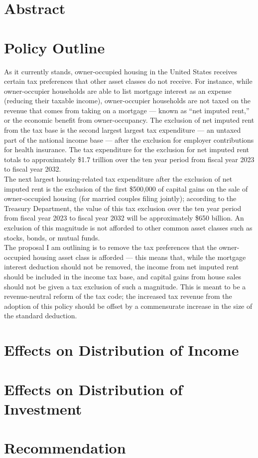 \documentclass[12pt]{extarticle}
\title{}
\author{}
\date{}
\begin{document}
\doublespacing
  \section*{Abstract}%
  \section*{Policy Outline}%
  As it currently stands, owner-occupied housing in the United States receives certain tax preferences that other asset classes do not receive. For instance, while owner-occupier households are able to list mortgage interest as an expense (reducing their taxable income), owner-occupier households are not taxed on the revenue that comes from taking on a mortgage --- known as ``net imputed rent,'' or the economic benefit from owner-occupancy. The exclusion of net imputed rent from the tax base is the second largest largest tax expenditure --- an untaxed part of the national income base --- after the exclusion for employer contributions for health insurance. The tax expenditure for the exclusion for net imputed rent totals to approximately \$1.7 trillion over the ten year period from fiscal year 2023 to fiscal year 2032.\\

  The next largest housing-related tax expenditure after the exclusion of net imputed rent is the exclusion of the first \$500,000 of capital gains on the sale of owner-occupied housing (for married couples filing jointly); according to the Treasury Department, the value of this tax exclusion over the ten year period from fiscal year 2023 to fiscal year 2032 will be approximately \$650 billion. An exclusion of this magnitude is not afforded to other common asset classes such as stocks, bonds, or mutual funds.\\

  The proposal I am outlining is to remove the tax preferences that the owner-occupied housing asset class is afforded --- this means that, while the mortgage interest deduction should not be removed, the income from net imputed rent should be included in the income tax base, and capital gains from house sales should not be given a tax exclusion of such a magnitude. This is meant to be a revenue-neutral reform of the tax code; the increased tax revenue from the adoption of this policy should be offset by a commensurate increase in the size of the standard deduction.
  \section*{Effects on Distribution of Income}%
  \section*{Effects on Distribution of Investment}%
  \section*{Recommendation}%
\end{document}
